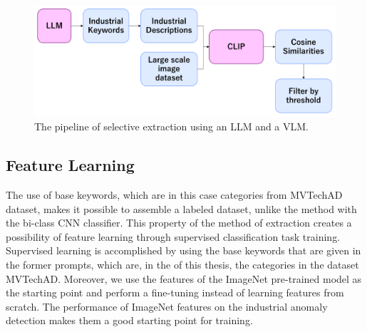 \begin{figure}[h]
	\begin{center}
		\includegraphics[width=1.0\linewidth]{Chapter_3/llm_extraction.png}
	\end{center}
	\caption{The pipeline of selective extraction using an LLM and a VLM.}
	\label{fig:llm_extraction}
\end{figure} 	

\subsection{Feature Learning}
\label{feature learning llm}
The use of base keywords, which are in this case categories from MVTechAD dataset, makes it possible to assemble a labeled dataset, unlike the method with the bi-class CNN classifier. This property of the method of extraction creates a possibility of feature learning through supervised classification task training. Supervised learning is accomplished by using the base keywords that are given in the former prompts, which are, in the of this thesis, the categories in the dataset MVTechAD. Moreover, we use the features of the ImageNet pre-trained model as the starting point and perform a fine-tuning instead of learning features from scratch. The performance of ImageNet features on the industrial anomaly detection makes them a good starting point for training.

